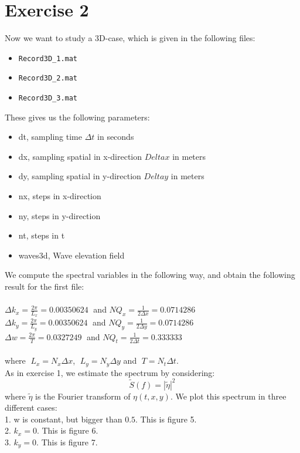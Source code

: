 \documentclass[12pt]{article}
\begin{document}
\section{Exercise 2}

Now we want to study a 3D-case, which is given in the following files:
\begin{itemize}
\item \verb|Record3D_1.mat|
\item \verb|Record3D_2.mat|
\item \verb|Record3D_3.mat|
\end{itemize}
These gives us the following parameters:
\begin{itemize}
\item dt, sampling time $\Delta t$ in seconds
\item dx, sampling spatial in x-direction $Delta x$ in meters
\item dy, sampling spatial in y-direction $Delta y$ in meters
\item nx, steps in x-direction
\item ny, steps in y-direction
\item nt, steps in t
\item waves3d, Wave elevation field
\end{itemize}
We compute the spectral variables in the following way, and obtain the following result for the first file:\\\\
$\Delta k_x = \frac{2\pi}{L_x} = 0.00350624\;$ and $ NQ_x = \frac{1}{2 \Delta x} =  0.0714286$\\
$\Delta k_y = \frac{2\pi}{L_y} = 0.00350624\;$ and $ NQ_y = \frac{1}{2 \Delta y} = 0.0714286$\\
$\Delta w = \frac{2\pi}{T} = 0.0327249\;$ and $ NQ_t =\frac{1}{2 \Delta t}= 0.333333$\\\\
where $\;L_x = N_x \Delta x$, $\;L_y = N_y \Delta y$ and $\;T =  N_t \Delta t$.\\
As in exercise 1, we estimate the spectrum by considering:
$$\tilde{S}(f) = |\tilde{\eta}|^2 $$
where $\tilde{\eta}$ is the Fourier transform of $\eta(t,x,y)$. We plot this spectrum in three different cases:\\
1. w is constant, but bigger than $0.5$. This is figure 5.\\
2. $k_x = 0$. This is figure 6.\\
3. $k_y = 0$. This is figure 7.\\\\
\end{document}
